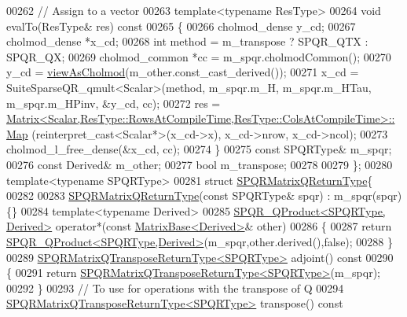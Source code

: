 \begin{DoxyCode}
00262   \textcolor{comment}{// Assign to a vector}
00263   \textcolor{keyword}{template}<\textcolor{keyword}{typename} ResType>
00264   \textcolor{keywordtype}{void} evalTo(ResType& res)\textcolor{keyword}{ const}
00265 \textcolor{keyword}{  }\{
00266     cholmod\_dense y\_cd;
00267     cholmod\_dense *x\_cd; 
00268     \textcolor{keywordtype}{int} method = m\_transpose ? SPQR\_QTX : SPQR\_QX; 
00269     cholmod\_common *cc = m\_spqr.cholmodCommon();
00270     y\_cd = \hyperlink{namespace_eigen_ac9fb9e40cfc9ddbdc7da84ee01bb7545}{viewAsCholmod}(m\_other.const\_cast\_derived());
00271     x\_cd = SuiteSparseQR\_qmult<Scalar>(method, m\_spqr.m\_H, m\_spqr.m\_HTau, m\_spqr.m\_HPinv, &y\_cd, cc);
00272     res = 
      \hyperlink{group___core___module_class_eigen_1_1_matrix}{Matrix<Scalar,ResType::RowsAtCompileTime,ResType::ColsAtCompileTime>::Map}
      (reinterpret\_cast<Scalar*>(x\_cd->x), x\_cd->nrow, x\_cd->ncol);
00273     cholmod\_l\_free\_dense(&x\_cd, cc);
00274   \}
00275   \textcolor{keyword}{const} SPQRType& m\_spqr; 
00276   \textcolor{keyword}{const} Derived& m\_other; 
00277   \textcolor{keywordtype}{bool} m\_transpose; 
00278   
00279 \};
00280 \textcolor{keyword}{template}<\textcolor{keyword}{typename} SPQRType>
00281 \textcolor{keyword}{struct }\hyperlink{struct_eigen_1_1_s_p_q_r_matrix_q_return_type}{SPQRMatrixQReturnType}\{
00282   
00283   \hyperlink{struct_eigen_1_1_s_p_q_r_matrix_q_return_type}{SPQRMatrixQReturnType}(\textcolor{keyword}{const} SPQRType& spqr) : m\_spqr(spqr) \{\}
00284   \textcolor{keyword}{template}<\textcolor{keyword}{typename} Derived>
00285   \hyperlink{struct_eigen_1_1_s_p_q_r___q_product}{SPQR\_QProduct<SPQRType, Derived>} operator*(\textcolor{keyword}{const} 
      \hyperlink{group___core___module_class_eigen_1_1_matrix_base}{MatrixBase<Derived>}& other)
00286   \{
00287     \textcolor{keywordflow}{return} \hyperlink{struct_eigen_1_1_s_p_q_r___q_product}{SPQR\_QProduct<SPQRType,Derived>}(m\_spqr,other.derived(),\textcolor{keyword}{false});
00288   \}
00289   \hyperlink{struct_eigen_1_1_s_p_q_r_matrix_q_transpose_return_type}{SPQRMatrixQTransposeReturnType<SPQRType>} adjoint()\textcolor{keyword}{ const}
00290 \textcolor{keyword}{  }\{
00291     \textcolor{keywordflow}{return} \hyperlink{struct_eigen_1_1_s_p_q_r_matrix_q_transpose_return_type}{SPQRMatrixQTransposeReturnType<SPQRType>}(m\_spqr);
00292   \}
00293   \textcolor{comment}{// To use for operations with the transpose of Q}
00294   \hyperlink{struct_eigen_1_1_s_p_q_r_matrix_q_transpose_return_type}{SPQRMatrixQTransposeReturnType<SPQRType>} transpose()\textcolor{keyword}{ const}

\end{DoxyCode}
